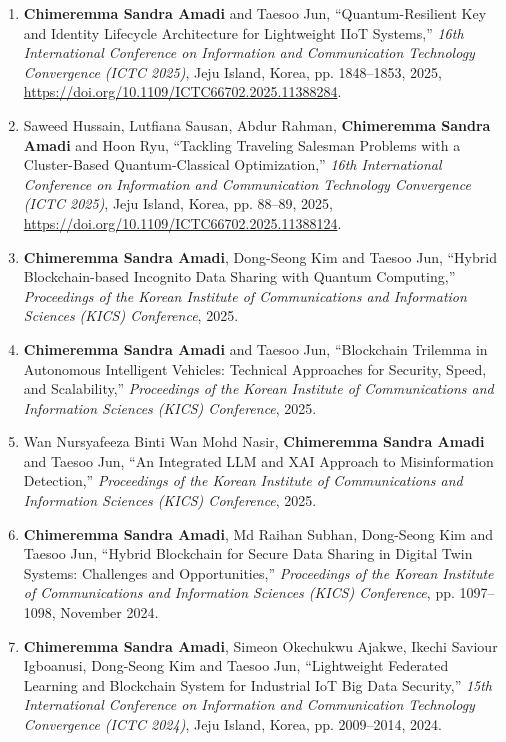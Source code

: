 \begin{titlepage}
\begin{enumerate}
\item \textbf{Chimeremma Sandra Amadi} and Taesoo Jun, ``Quantum-Resilient Key and Identity Lifecycle Architecture for Lightweight IIoT Systems,'' \textit{16th International Conference on Information and Communication Technology Convergence (ICTC 2025)}, Jeju Island, Korea, pp. 1848--1853, 2025, \url{https://doi.org/10.1109/ICTC66702.2025.11388284}.

\item Saweed Hussain, Lutfiana Sausan, Abdur Rahman, \textbf{Chimeremma Sandra Amadi} and Hoon Ryu, ``Tackling Traveling Salesman Problems with a Cluster-Based Quantum-Classical Optimization,'' \textit{16th International Conference on Information and Communication Technology Convergence (ICTC 2025)}, Jeju Island, Korea, pp. 88--89, 2025, \url{https://doi.org/10.1109/ICTC66702.2025.11388124}.

\item \textbf{Chimeremma Sandra Amadi}, Dong-Seong Kim and Taesoo Jun, ``Hybrid Blockchain-based Incognito Data Sharing with Quantum Computing,'' \textit{Proceedings of the Korean Institute of Communications and Information Sciences (KICS) Conference}, 2025.

\item \textbf{Chimeremma Sandra Amadi} and Taesoo Jun, ``Blockchain Trilemma in Autonomous Intelligent Vehicles: Technical Approaches for Security, Speed, and Scalability,'' \textit{Proceedings of the Korean Institute of Communications and Information Sciences (KICS) Conference}, 2025.

\item Wan Nursyafeeza Binti Wan Mohd Nasir, \textbf{Chimeremma Sandra Amadi} and Taesoo Jun, ``An Integrated LLM and XAI Approach to Misinformation Detection,'' \textit{Proceedings of the Korean Institute of Communications and Information Sciences (KICS) Conference}, 2025.

\item \textbf{Chimeremma Sandra Amadi}, Md Raihan Subhan, Dong-Seong Kim and Taesoo Jun, ``Hybrid Blockchain for Secure Data Sharing in Digital Twin Systems: Challenges and Opportunities,'' \textit{Proceedings of the Korean Institute of Communications and Information Sciences (KICS) Conference}, pp. 1097--1098, November 2024.

\item \textbf{Chimeremma Sandra Amadi}, Simeon Okechukwu Ajakwe, Ikechi Saviour Igboanusi, Dong-Seong Kim and Taesoo Jun, ``Lightweight Federated Learning and Blockchain System for Industrial IoT Big Data Security,'' \textit{15th International Conference on Information and Communication Technology Convergence (ICTC 2024)}, Jeju Island, Korea, pp. 2009--2014, 2024.


\end{enumerate}
\end{titlepage}
